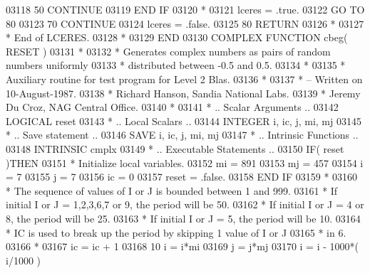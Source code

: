 \begin{DoxyCode}
03118    50    \textcolor{keywordflow}{CONTINUE}
03119 \textcolor{keywordflow}{      END IF}
03120 \textcolor{comment}{*}
03121       lceres = .true.
03122       \textcolor{keywordflow}{GO TO} 80
03123    70 \textcolor{keywordflow}{CONTINUE}
03124       lceres = .false.
03125    80 \textcolor{keywordflow}{RETURN}
03126 \textcolor{comment}{*}
03127 \textcolor{comment}{*     End of LCERES.}
03128 \textcolor{comment}{*}
03129 \textcolor{keyword}{      END}
03130 \textcolor{keyword}{      COMPLEX }\textcolor{keyword}{FUNCTION }cbeg( RESET )
03131 \textcolor{comment}{*}
03132 \textcolor{comment}{*  Generates complex numbers as pairs of random numbers uniformly}
03133 \textcolor{comment}{*  distributed between -0.5 and 0.5.}
03134 \textcolor{comment}{*}
03135 \textcolor{comment}{*  Auxiliary routine for test program for Level 2 Blas.}
03136 \textcolor{comment}{*}
03137 \textcolor{comment}{*  -- Written on 10-August-1987.}
03138 \textcolor{comment}{*     Richard Hanson, Sandia National Labs.}
03139 \textcolor{comment}{*     Jeremy Du Croz, NAG Central Office.}
03140 \textcolor{comment}{*}
03141 \textcolor{comment}{*     .. Scalar Arguments ..}
03142       \textcolor{keywordtype}{LOGICAL}            reset
03143 \textcolor{comment}{*     .. Local Scalars ..}
03144       \textcolor{keywordtype}{INTEGER}            i, ic, j, mi, mj
03145 \textcolor{comment}{*     .. Save statement ..}
03146       \textcolor{keywordtype}{SAVE}               i, ic, j, mi, mj
03147 \textcolor{comment}{*     .. Intrinsic Functions ..}
03148       \textcolor{keywordtype}{INTRINSIC}          cmplx
03149 \textcolor{comment}{*     .. Executable Statements ..}
03150       \textcolor{keywordflow}{IF}( reset )\textcolor{keywordflow}{THEN}
03151 \textcolor{comment}{*        Initialize local variables.}
03152          mi = 891
03153          mj = 457
03154          i = 7
03155          j = 7
03156          ic = 0
03157          reset = .false.
03158 \textcolor{keywordflow}{      END IF}
03159 \textcolor{comment}{*}
03160 \textcolor{comment}{*     The sequence of values of I or J is bounded between 1 and 999.}
03161 \textcolor{comment}{*     If initial I or J = 1,2,3,6,7 or 9, the period will be 50.}
03162 \textcolor{comment}{*     If initial I or J = 4 or 8, the period will be 25.}
03163 \textcolor{comment}{*     If initial I or J = 5, the period will be 10.}
03164 \textcolor{comment}{*     IC is used to break up the period by skipping 1 value of I or J}
03165 \textcolor{comment}{*     in 6.}
03166 \textcolor{comment}{*}
03167       ic = ic + 1
03168    10 i = i*mi
03169       j = j*mj
03170       i = i - 1000*( i/1000 )

\end{DoxyCode}
